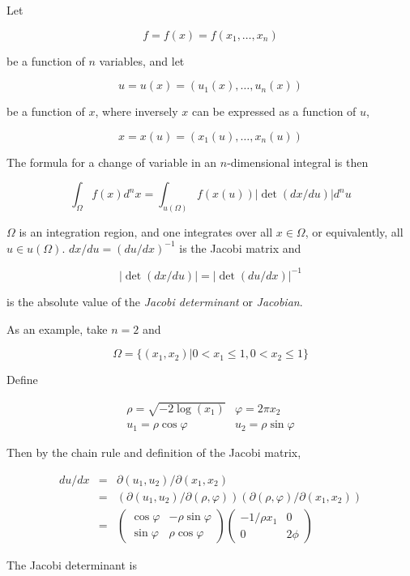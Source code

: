 \documentclass[12pt]{article}
\begin{document}
Let

$$ f=f(x) = f(x_1,\ldots,x_n) $$

be a function of $n$ variables, and let

$$ u = u(x) = (u_1(x),\ldots,u_n(x)) $$

be a function of $x$, where inversely $x$ can be expressed as a function of $u$,

$$ x = x(u) = (x_1(u), \ldots,x_n(u)) $$

The formula for a change of variable in an $n$-dimensional integral is then

$$ \int_\Omega f(x)d^nx = \int_{u(\Omega)} f(x(u))|\det(dx/du)|d^nu  $$

$\Omega$ is an integration region, and one integrates over all $x \in \Omega$, or equivalently, all $u \in u(\Omega)$. $dx/du = (du/dx)^{-1}$ is the Jacobi matrix and

$$ | \det(dx/du)| = |\det(du/dx)|^{-1} $$

is the absolute value of the \emph{Jacobi determinant} or \emph{Jacobian}.

As an example, take $n=2$ and

$$ \Omega = \{(x_1,x_2) | 0<x_1 \le 1, 0 < x_2 \le 1 \} $$

Define

$$ \begin{array}{cc}\rho = \sqrt{-2 \log(x_1)} & \varphi = 2\pi x_2 \\
    u_1 = \rho \cos \varphi & u_2 = \rho \sin \varphi \end{array} $$

Then by the chain rule and definition of the Jacobi matrix,

\begin{eqnarray*}
 du/dx & = & \partial(u_1,u_2) / \partial(x_1,x_2) \\
       & = & (\partial(u_1,u_2)/\partial(\rho,\varphi))(\partial(\rho,\varphi)/\partial(x_1,x_2)) \\
       & = & \begin{pmatrix}\cos \varphi & - \rho \sin \varphi \\ \sin \varphi & \rho \cos \varphi \end{pmatrix} \begin{pmatrix}-1 / \rho x_1 & 0 \\ 0 & 2 \phi \end{pmatrix} 
\end{eqnarray*}

The Jacobi determinant is
\end{document}
